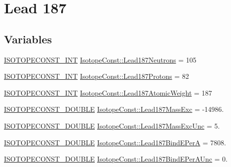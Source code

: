 \hypertarget{group___isotope_const-_lead-_pb187}{}\section{Lead 187}
\label{group___isotope_const-_lead-_pb187}
\subsection*{Variables}
\begin{DoxyCompactItemize}
\item 
\mbox{\hyperlink{group___isotope_const-_macros_ga5f18360b3e99483a35c32d789e62621c}{I\+S\+O\+T\+O\+P\+E\+C\+O\+N\+S\+T\+\_\+\+I\+NT}} \mbox{\hyperlink{group___isotope_const-_lead-_pb187_ga37a05596986bda8196fc7f7a47ea8fa6}{Isotope\+Const\+::\+Lead187\+Neutrons}} = 105
\item 
\mbox{\hyperlink{group___isotope_const-_macros_ga5f18360b3e99483a35c32d789e62621c}{I\+S\+O\+T\+O\+P\+E\+C\+O\+N\+S\+T\+\_\+\+I\+NT}} \mbox{\hyperlink{group___isotope_const-_lead-_pb187_gac03dbfb22983694794d84b33ce7811a2}{Isotope\+Const\+::\+Lead187\+Protons}} = 82
\item 
\mbox{\hyperlink{group___isotope_const-_macros_ga5f18360b3e99483a35c32d789e62621c}{I\+S\+O\+T\+O\+P\+E\+C\+O\+N\+S\+T\+\_\+\+I\+NT}} \mbox{\hyperlink{group___isotope_const-_lead-_pb187_ga4d750a14053609e653415189a7bbdc2e}{Isotope\+Const\+::\+Lead187\+Atomic\+Weight}} = 187
\item 
\mbox{\hyperlink{group___isotope_const-_macros_ga8f45a7272ce02c0b4c65c44636ed719a}{I\+S\+O\+T\+O\+P\+E\+C\+O\+N\+S\+T\+\_\+\+D\+O\+U\+B\+LE}} \mbox{\hyperlink{group___isotope_const-_lead-_pb187_gabf8e1d6e6263458965f95f3e73d5b227}{Isotope\+Const\+::\+Lead187\+Mass\+Exc}} = -\/14986.
\item 
\mbox{\hyperlink{group___isotope_const-_macros_ga8f45a7272ce02c0b4c65c44636ed719a}{I\+S\+O\+T\+O\+P\+E\+C\+O\+N\+S\+T\+\_\+\+D\+O\+U\+B\+LE}} \mbox{\hyperlink{group___isotope_const-_lead-_pb187_ga0cda1bd37a7fc33bf4c4a95b6c6c3fde}{Isotope\+Const\+::\+Lead187\+Mass\+Exc\+Unc}} = 5.
\item 
\mbox{\hyperlink{group___isotope_const-_macros_ga8f45a7272ce02c0b4c65c44636ed719a}{I\+S\+O\+T\+O\+P\+E\+C\+O\+N\+S\+T\+\_\+\+D\+O\+U\+B\+LE}} \mbox{\hyperlink{group___isotope_const-_lead-_pb187_ga340793860e1f493f78f59da447a55de1}{Isotope\+Const\+::\+Lead187\+Bind\+E\+PerA}} = 7808.
\item 
\mbox{\hyperlink{group___isotope_const-_macros_ga8f45a7272ce02c0b4c65c44636ed719a}{I\+S\+O\+T\+O\+P\+E\+C\+O\+N\+S\+T\+\_\+\+D\+O\+U\+B\+LE}} \mbox{\hyperlink{group___isotope_const-_lead-_pb187_ga47b588406cca85f4b7751e7d65af3884}{Isotope\+Const\+::\+Lead187\+Bind\+E\+Per\+A\+Unc}} = 0.

\end{DoxyCompactItemize}
